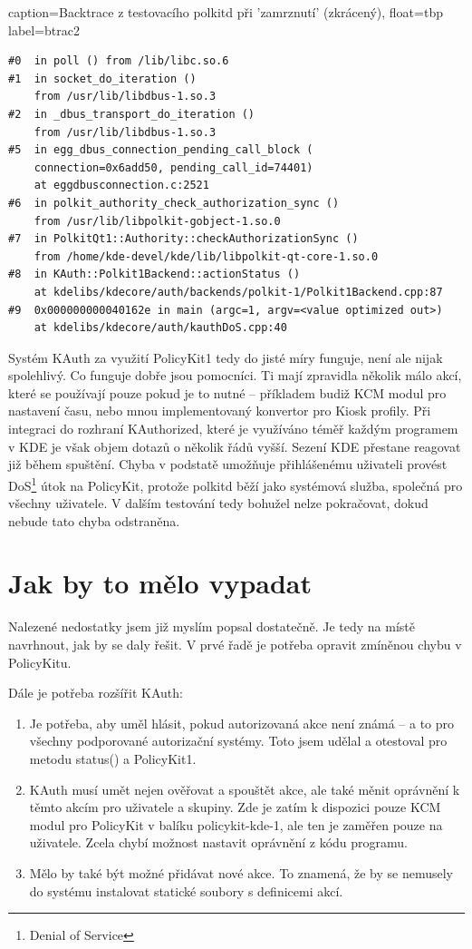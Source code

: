 \lstset
{
    caption=Backtrace z testovacího polkitd při 'zamrznutí' (zkrácený),
    float=tbp
    label=btrac2
}
\begin{lstlisting}
#0  in poll () from /lib/libc.so.6
#1  in socket_do_iteration ()
    from /usr/lib/libdbus-1.so.3
#2  in _dbus_transport_do_iteration ()
    from /usr/lib/libdbus-1.so.3
#5  in egg_dbus_connection_pending_call_block (
    connection=0x6add50, pending_call_id=74401)
    at eggdbusconnection.c:2521
#6  in polkit_authority_check_authorization_sync ()
    from /usr/lib/libpolkit-gobject-1.so.0
#7  in PolkitQt1::Authority::checkAuthorizationSync ()
    from /home/kde-devel/kde/lib/libpolkit-qt-core-1.so.0
#8  in KAuth::Polkit1Backend::actionStatus ()
    at kdelibs/kdecore/auth/backends/polkit-1/Polkit1Backend.cpp:87
#9  0x000000000040162e in main (argc=1, argv=<value optimized out>)
    at kdelibs/kdecore/auth/kauthDoS.cpp:40 
\end{lstlisting}

Systém KAuth za využití PolicyKit1 tedy do jisté míry funguje, není ale nijak
spolehlivý. Co funguje dobře jsou pomocníci. Ti mají zpravidla několik málo
akcí, které se používají pouze pokud je to nutné -- příkladem budiž KCM modul
pro nastavení času, nebo mnou implementovaný konvertor pro Kiosk profily.
Při integraci do rozhraní KAuthorized, které je využíváno téměř každým programem
v KDE je však objem dotazů o několik řádů vyšší. Sezení KDE přestane reagovat
již během spuštění. Chyba v podstatě umožňuje přihlášenému uživateli provést
DoS\footnote{Denial of Service} útok na PolicyKit, protože polkitd běží jako
systémová služba, společná pro všechny uživatele. V dalším testování tedy
bohužel nelze pokračovat, dokud nebude tato chyba odstraněna. 

\section{Jak by to mělo vypadat}
Nalezené nedostatky jsem již myslím popsal dostatečně. Je tedy na místě
navrhnout, jak by se daly řešit. V prvé řadě je potřeba opravit zmíněnou chybu
v PolicyKitu.

Dále je potřeba rozšířit KAuth:
\begin{enumerate}
\item Je potřeba, aby uměl hlásit, pokud autorizovaná akce není známá -- a
to pro všechny podporované autorizační systémy. Toto jsem udělal a otestoval
pro metodu status() a PolicyKit1.
\item KAuth musí umět nejen ověřovat a spouštět akce, ale také měnit oprávnění
k těmto akcím pro uživatele a skupiny. Zde je zatím k dispozici pouze KCM modul
pro PolicyKit v balíku policykit-kde-1, ale ten je zaměřen pouze na uživatele.
Zcela chybí možnost nastavit oprávnění z kódu programu.
\item Mělo by také být možné přidávat nové akce. To znamená, že by se nemusely
do systému instalovat statické soubory s definicemi akcí.
\end{enumerate}

